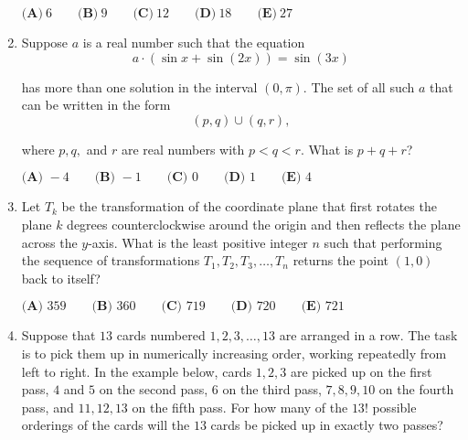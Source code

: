 \documentclass{article}
\begin{document}
\begin{enumerate}[label=\arabic*., itemsep=0.5em]
$\textbf{(A)} ~6 \qquad\textbf{(B)} ~9 \qquad\textbf{(C)} ~12 \qquad\textbf{(D)} ~18 \qquad\textbf{(E)} ~27 $\par \vspace{0.5em}\item Suppose $a$ is a real number such that the equation 
\begin{equation*}
a\cdot(\sin{x}+\sin{(2x)}) = \sin{(3x)}
\end{equation*}

has more than one solution in the interval $(0, \pi)$. The set of all such $a$ that can be written
in the form 
\begin{equation*}
(p,q) \cup (q,r),
\end{equation*}

where $p, q,$ and $r$ are real numbers with $p < q< r$. What is $p+q+r$?

$\textbf{(A) } {-}4 \qquad \textbf{(B) } {-}1 \qquad \textbf{(C) } 0 \qquad \textbf{(D) } 1 \qquad \textbf{(E) } 4$\par \vspace{0.5em}\item Let $T_k$ be the transformation of the coordinate plane that first rotates the plane $k$ degrees counterclockwise around the origin and then reflects the plane across the $y$-axis. What is the least positive integer $n$ such that performing the sequence of transformations $T_1, T_2, T_3, \dots, T_n$ returns the point $(1,0)$ back to itself?

$\textbf{(A) } 359 \qquad \textbf{(B) } 360\qquad \textbf{(C) } 719 \qquad \textbf{(D) } 720 \qquad \textbf{(E) } 721$\par \vspace{0.5em}\item Suppose that $13$ cards numbered $1, 2, 3, \ldots, 13$ are arranged in a row. The task is to pick them up in numerically increasing order, working repeatedly from left to right. In the example below, cards $1, 2, 3$ are picked up on the first pass, $4$ and $5$ on the second pass, $6$ on the third pass, $7, 8, 9, 10$ on the fourth pass, and $11, 12, 13$ on the fifth pass. For how many of the $13!$ possible orderings of the cards will the $13$ cards be picked up in exactly two passes?



\end{enumerate}
\end{document}
